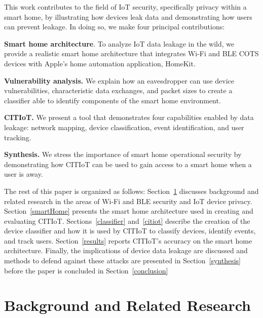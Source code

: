 \documentclass[conference]{./IEEEtran/IEEEtran}
\begin{document}
This work contributes to the field of \ac{IoT} security, specifically privacy within a smart home, by illustrating how devices leak data and demonstrating how users can prevent leakage. In doing so, we make four principal contributions:

\textbf{Smart home architecture}. To analyze \ac{IoT} data leakage in the wild, we provide a realistic smart home architecture that integrates Wi-Fi and \ac{BLE} \ac{COTS} devices with Apple's home automation application, HomeKit.

\textbf{Vulnerability analysis.} We explain how an eavesdropper can use device vulnerabilities, characteristic data exchanges, and packet sizes to create a classifier able to identify components of the smart home environment.

\textbf{\ac{CITIoT}.} We present a tool that demonstrates four capabilities enabled by data leakage: network mapping, device classification, event identification, and user tracking.

\figSmartHomeArchitecture

\textbf{Synthesis.} We stress the importance of smart home operational security by demonstrating how \ac{CITIoT} can be used to gain access to a smart home when a user is away.

The rest of this paper is organized as follows: Section~\ref{background} discusses background and related research in the areas of Wi-Fi and \ac{BLE} security and \ac{IoT} device privacy. Section~\ref{smartHome} presents the smart home architecture used in creating and evaluating \ac{CITIoT}. Sections~\ref{classifier} and~\ref{citiot} describe the creation of the device classifier and how it is used by \ac{CITIoT} to classify devices, identify events, and track users. Section~\ref{results} reports \ac{CITIoT}'s accuracy on the smart home architecture. Finally, the implications of device data leakage are discussed and methods to defend against these attacks are presented in Section~\ref{synthesis} before the paper is concluded in Section~\ref{conclusion}

\section{Background and Related Research}\label{background}
\end{document}
